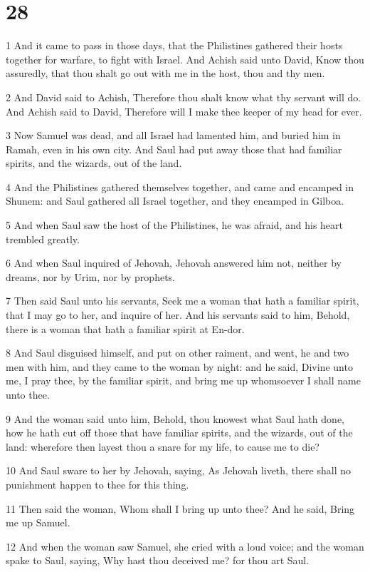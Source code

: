 \chapter{28}

\par 1 And it came to pass in those days, that the Philistines gathered their hosts together for warfare, to fight with Israel. And Achish said unto David, Know thou assuredly, that thou shalt go out with me in the host, thou and thy men.
\par 2 And David said to Achish, Therefore thou shalt know what thy servant will do. And Achish said to David, Therefore will I make thee keeper of my head for ever.
\par 3 Now Samuel was dead, and all Israel had lamented him, and buried him in Ramah, even in his own city. And Saul had put away those that had familiar spirits, and the wizards, out of the land.
\par 4 And the Philistines gathered themselves together, and came and encamped in Shunem: and Saul gathered all Israel together, and they encamped in Gilboa.
\par 5 And when Saul saw the host of the Philistines, he was afraid, and his heart trembled greatly.
\par 6 And when Saul inquired of Jehovah, Jehovah answered him not, neither by dreams, nor by Urim, nor by prophets.
\par 7 Then said Saul unto his servants, Seek me a woman that hath a familiar spirit, that I may go to her, and inquire of her. And his servants said to him, Behold, there is a woman that hath a familiar spirit at En-dor.
\par 8 And Saul disguised himself, and put on other raiment, and went, he and two men with him, and they came to the woman by night: and he said, Divine unto me, I pray thee, by the familiar spirit, and bring me up whomsoever I shall name unto thee.
\par 9 And the woman said unto him, Behold, thou knowest what Saul hath done, how he hath cut off those that have familiar spirits, and the wizards, out of the land: wherefore then layest thou a snare for my life, to cause me to die?
\par 10 And Saul sware to her by Jehovah, saying, As Jehovah liveth, there shall no punishment happen to thee for this thing.
\par 11 Then said the woman, Whom shall I bring up unto thee? And he said, Bring me up Samuel.
\par 12 And when the woman saw Samuel, she cried with a loud voice; and the woman spake to Saul, saying, Why hast thou deceived me? for thou art Saul.

